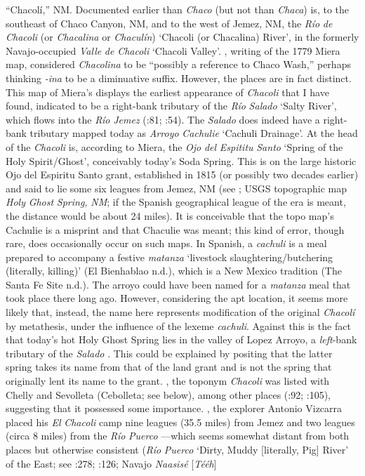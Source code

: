 “Chacolí,” NM.  Documented earlier than \textit{Chaco} (but not than \textit{Chaca}) is, to the southeast of Chaco Canyon, NM, and to the west of Jemez, NM, the \textit{Río} \textit{de} \textit{Chacoli} (or \textit{Chacalina} or \textit{Chaculín}) ‘Chacoli (or Chacalina) River’, in the formerly Navajo-occupied \textit{Valle} \textit{de} \textit{Chacoli} ‘Chacoli Valley’.  \citet[61]{Díaz2014}, writing of the 1779 Miera map, considered \textit{Chacolina} to be “possibly a reference to Chaco Wash,” perhaps thinking \textit{{}-ina} to be a diminuative suffix.  However, the places are in fact distinct.  This map of Miera’s displays the earliest appearance of \textit{Chacoli} that I have found, indicated to be a right-bank tributary of the \textit{Río} \textit{Salado} ‘Salty River’, which flows into the \textit{Río} \textit{Jemez} (\citealt{Kessell2013}:81; \citealt{Eidenbach2012}:54).  The \textit{Salado} does indeed have a right-bank tributary mapped today as \textit{Arroyo} \textit{Cachulie} ‘Cachuli Drainage’.  At the head of the \textit{Chacoli} is, according to Miera, the \textit{Ojo} \textit{del} \textit{Espititu} \textit{Santo} ‘Spring of the Holy Spirit/Ghost’, conceivably today’s Soda Spring.  This is on the large historic Ojo del Espiritu Santo grant, established in 1815 (or possibly two decades earlier) and said to lie some six leagues from Jemez, NM (see \citealt{Bowden2004}; USGS topographic map \textit{Holy} \textit{Ghost} \textit{Spring,} \textit{NM}; if the Spanish geographical league of the era is meant, the distance would be about 24 miles).  It is conceivable that the topo map’s Cachulie is a misprint and that Chaculie was meant; this kind of error, though rare, does occasionally occur on such maps.  In Spanish, a \textit{cachuli} is a meal prepared to accompany a festive \textit{matanza} ‘livestock slaughtering/butchering (literally, killing)’ (El Bienhablao n.d.), which is a New Mexico tradition (The Santa Fe Site n.d.).  The arroyo could have been named for a \textit{matanza} meal that took place there long ago.  However, considering the apt location, it seems more likely that, instead, the name here represents modification of the original \textit{Chacolí} by metathesis, under the influence of the lexeme \textit{cachuli}.  Against this is the fact that today’s hot Holy Ghost Spring lies in the valley of Lopez Arroyo, a \textit{left}{}-bank tributary of the \textit{Salado} \citep[247]{Julyan1998}.  This could be explained by positing that the latter spring takes its name from that of the land grant and is not the spring that originally lent its name to the grant.  \citealt{In1796}, the toponym \textit{Chacoli} was listed with Chelly and Sevolleta (Cebolleta; see below), among other places (\citealt{Correll1979}:92; \citealt{Reeve1971a}:105), suggesting that it possessed some importance.  \citealt{In1823}, the explorer Antonio Vizcarra placed his \textit{El} \textit{Chacoli} camp nine leagues (35.5 miles) from Jemez and two leagues (circa 8 miles) from the \textit{Río} \textit{Puerco} \citep[44]{Linford2005}—which seems somewhat distant from both places but otherwise consistent (\textit{Río} \textit{Puerco} ‘Dirty, Muddy [literally, Pig] River’ of the East; see \citealt{Julyan1998}:278; \citealt{BillsVigil2008}:126; Navajo \textit{Naasisé} [\textit{Tééh}] 